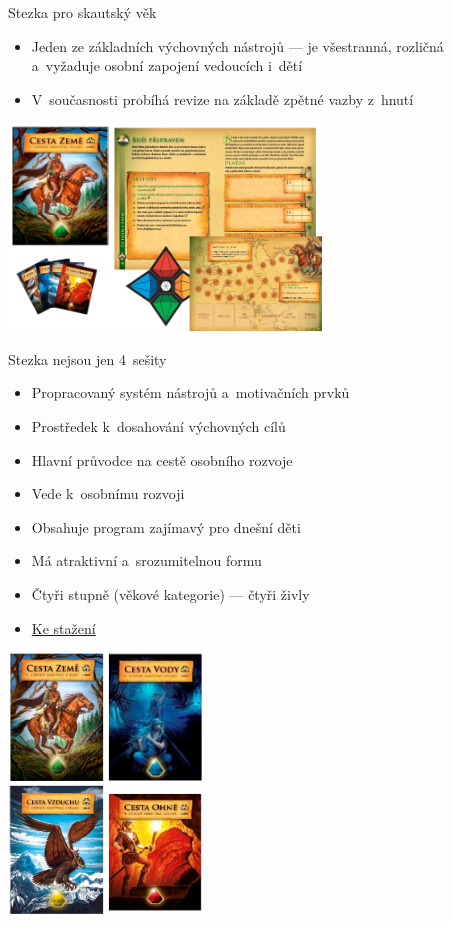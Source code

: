 \documentclass[compress, ucs, xelatex, xcolor=dvipsnames, print,
  hyperref={
    bookmarks=true,
    unicode=true,
    colorlinks=true,
    plainpages=false,
    pdfkeywords={Skaut, Junak, Skauting, Vychovna metoda},
    linkcolor=Black,
    anchorcolor=Black,
    citecolor=OliveGreen,
    filecolor=OliveGreen,
    menucolor=Black,
    urlcolor=OliveGreen,
    pdftex}
  ]{beamer}
\begin{document}
\begin{frame}{Stezka pro skautský věk}
  \begin{itemize}
    \item Jeden ze základních výchovných nástrojů --- je všestranná, rozličná a~vyžaduje osobní zapojení vedoucích i~dětí
    \item V~současnosti probíhá revize na základě zpětné vazby z~hnutí
  \end{itemize}
  \begin{center}
    \includegraphics[height=5.5cm]{stezka.png}
  \end{center}
\end{frame}

\begin{frame}{Stezka nejsou jen 4~sešity}
  \begin{multicols}{2}
    \begin{itemize}
      \item Propracovaný systém nástrojů a~motivačních prvků
      \item Prostředek k~dosahování výchovných cílů
      \item Hlavní průvodce na cestě osobního rozvoje
      \item Vede k~osobnímu rozvoji
      \item Obsahuje program zajímavý pro dnešní děti
      \item Má atraktivní a~srozumitelnou formu
      \item Čtyři stupně (věkové kategorie) --- čtyři živly
      \item \href{https://krizovatka.skaut.cz/oddil/program/dle-vychovnych-kategorii/skauti-skautky/skauti-skautky-stezky/skauti-skautky-stezky-stezky}{Ke stažení}
    \end{itemize}
    \columnbreak
    \includegraphics[height=7cm]{stezky.png}
  \end{multicols}
\end{frame}
\end{document}
